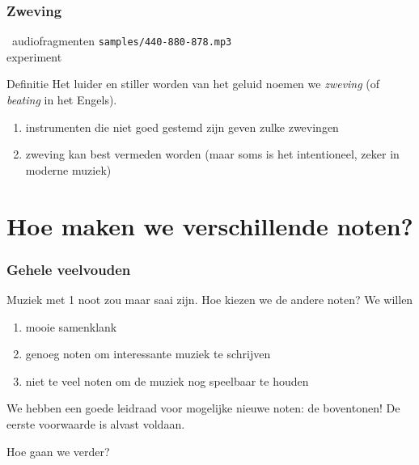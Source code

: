 \documentclass[compress, darktitle, framenumber, totalframenumber]{beamer}
\begin{document}
\begin{frame}
  \frametitle{Zweving}

  \begin{block}{\twonotes\ audiofragmenten}
    \texttt{samples/440-880-878.mp3} \\
    experiment
  \end{block}

  \pause

  \begin{alertblock}{Definitie}
    Het luider en stiller worden van het geluid noemen we \emph{zweving} (of \emph{beating} in het Engels).
  \end{alertblock}

  \begin{enumerate}
    \item instrumenten die niet goed gestemd zijn geven zulke zwevingen
    \item zweving kan best vermeden worden (maar soms is het intentioneel, zeker in moderne muziek)
  \end{enumerate}
\end{frame}


\section{Hoe maken we verschillende noten?}

\begin{frame}
  \frametitle{Gehele veelvouden}

  Muziek met 1 noot zou maar saai zijn. Hoe kiezen we de andere noten? \pause We willen
  \begin{enumerate}
    \item mooie samenklank
    \item \pause genoeg noten om interessante muziek te schrijven
    \item \pause niet te veel noten om de muziek nog speelbaar te houden
  \end{enumerate}

  We hebben een goede leidraad voor mogelijke nieuwe noten: de \alert{boventonen}! De eerste voorwaarde is alvast voldaan.

  Hoe gaan we verder?
\end{frame}
\end{document}
